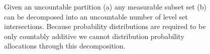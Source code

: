 \documentclass[
  letterpaper,
  DIV=11,
  numbers=noendperiod]{scrartcl}
\begin{document}
\begin{figure}

\begin{minipage}{0.50\linewidth}


\subcaption{\label{fig-decomposition-subset}}

\end{minipage}%
%
\begin{minipage}{0.50\linewidth}


\subcaption{\label{fig-decomposition-continuous}}

\end{minipage}%

\caption{\label{fig-general-decomposition}Given an uncountable partition
(a) any measurable subset set (b) can be decomposed into an uncountable
number of level set intersections. Because probability distributions are
required to be only countably additive we cannot distribution
probability allocations through this decomposition.}

\end{figure}%
\end{document}

